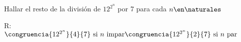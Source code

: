 \ejExtra
Hallar el resto de la división de $12^{2^n}$ por 7 para cada $n \en \naturales$

\separadorCorto

R:\\
$
\congruencia{12^{2^n}}{4}{7} \text{ si } n \text{ impar}\\
\congruencia{12^{2^n}}{2}{7} \text{ si } n \text{ par}\\
$

